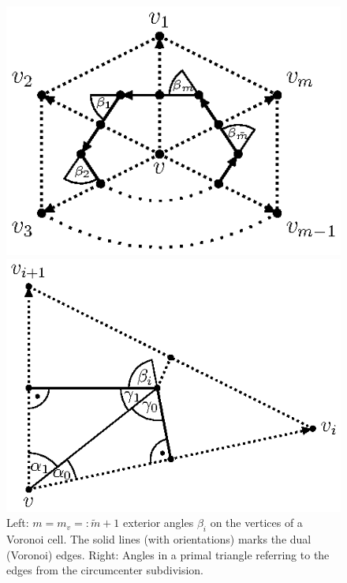     \begin{figure}
      \begin{minipage}[htp]{.235\textwidth}
        \centering\includegraphics[width=.99\textwidth]{bilder/tikz/GaussBonnet.eps}
      \end{minipage}
      \hfill
      \begin{minipage}[htp]{.235\textwidth}
        \centering\includegraphics[width=.99\textwidth]{bilder/tikz/ElementGaussBonnet.eps}
      \end{minipage}
      \caption{Left: \(  m = m_{v} =: \tilde{m}+1 \) exterior angles \( \beta_{i} \) on the vertices of a Voronoi cell.
                The solid lines (with orientations) marks the dual (Voronoi) edges.
               Right: Angles in a primal triangle referring to the edges from the circumcenter subdivision.}
      \label{figGaussBonnet}
    \end{figure}
